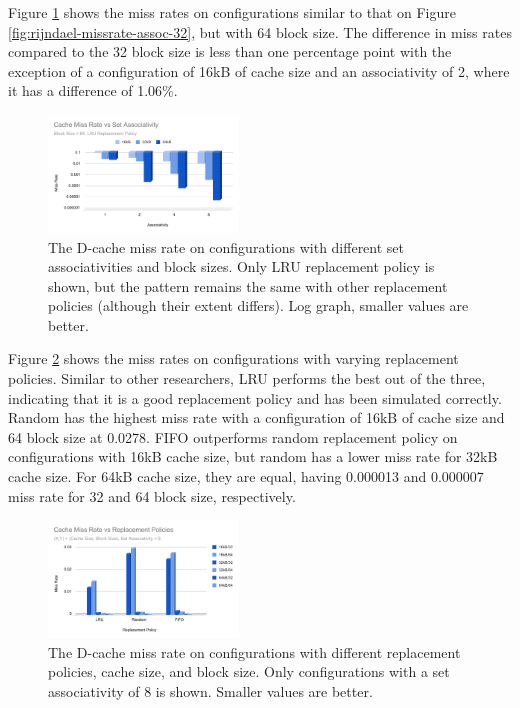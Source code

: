 \documentclass[conference]{IEEEtran}
\begin{document}
Figure \ref{fig:rijndael-missrate-assoc-64} shows the miss rates on configurations similar to that on Figure \ref{fig:rijndael-missrate-assoc-32}, but with 64 block size. The difference in miss rates compared to the 32 block size is less than one percentage point with the exception of a configuration of 16kB of cache size and an associativity of 2, where it has a difference of 1.06\%.

\begin{figure}[H]
  \centering
  \includegraphics[width=0.45\textwidth]{images/missrate_assoc_64}
  \caption{The D-cache miss rate on configurations with different set associativities and block sizes. Only LRU replacement policy is shown, but the pattern remains the same with other replacement policies (although their extent differs). Log graph, smaller values are better.}
  \label{fig:rijndael-missrate-assoc-64}
\end{figure}

Figure \ref{fig:rijndael-missrate-replacement} shows the miss rates on configurations with varying replacement policies. Similar to other researchers, LRU performs the best out of the three, indicating that it is a good replacement policy and has been simulated correctly. Random has the highest miss rate with a configuration of 16kB of cache size and 64 block size at 0.0278. FIFO outperforms random replacement policy on configurations with 16kB cache size, but random has a lower miss rate for 32kB cache size. For 64kB cache size, they are equal, having 0.000013 and 0.000007 miss rate for 32 and 64 block size, respectively.

\begin{figure}[H]
  \centering
  \includegraphics[width=0.45\textwidth]{images/missrate_replacement}
  \caption{The D-cache miss rate on configurations with different replacement policies, cache size, and block size. Only configurations with a set associativity of 8 is shown. Smaller values are better.}
  \label{fig:rijndael-missrate-replacement}
\end{figure}
\end{document}
